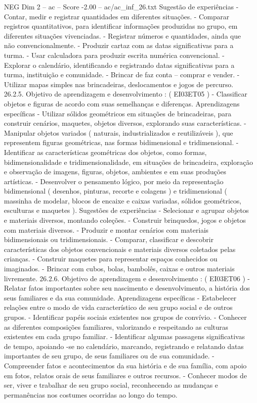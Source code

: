 \begin{textsample}{NEG Dim 2 – ac – Score -2.00 – ac/ac\_inf\_26.txt}
Sugestão de experiências - Contar, medir e registrar quantidades em diferentes situações. - Comparar registros quantitativos, para identificar informações produzidas no grupo, em diferentes situações vivenciadas. - Registrar números e quantidades, ainda que não convencionalmente. - Produzir cartaz com as datas significativas para a turma. - Usar calculadora para produzir escrita numérica convencional. - Explorar o calendário, identificando e registrando datas significativas para a turma, instituição e comunidade. - Brincar de faz conta – comprar e vender. - Utilizar mapas simples nas brincadeiras, deslocamentos e jogos de percurso. 26.2.5.
Objetivo de aprendizagem e desenvolvimento : ( EI03ET05 ) - Classificar objetos e figuras de acordo com suas semelhanças e diferenças.
Aprendizagens específicas - Utilizar sólidos geométricos em situações de brincadeiras, para construir cenários, maquetes, objetos diversos, explorando suas características. - Manipular objetos variados ( naturais, industrializados e reutilizáveis ), que representem figuras geométricas, nas formas bidimensional e tridimensional. - Identificar as características geométricas dos objetos, como formas, bidimensionalidade e tridimensionalidade, em situações de brincadeira, exploração e observação de imagens, figuras, objetos, ambientes e em suas produções artísticas. - Desenvolver o pensamento lógico, por meio da representação bidimensional ( desenhos, pinturas, recorte e colagens ) e tridimensional ( massinha de modelar, blocos de encaixe e caixas variadas, sólidos geométricos, esculturas e maquetes ).
Sugestões de experiências - Selecionar e agrupar objetos e materiais diversos, montando coleções. - Construir brinquedos, jogos e objetos com materiais diversos. - Produzir e montar cenários com materiais bidimensionais ou tridimensionais. - Comparar, classificar e descobrir características dos objetos convencionais e materiais diversos coletados pelas crianças. - Construir maquetes para representar espaços conhecidos ou imaginados. - Brincar com cubos, bolas, bambolês, caixas e outros materiais livremente. 26.2.6.
Objetivo de aprendizagem e desenvolvimento : ( EI03ET06 ) - Relatar fatos importantes sobre seu nascimento e desenvolvimento, a história dos seus familiares e da sua comunidade.
Aprendizagens específicas - Estabelecer relações entre o modo de vida característico de seu grupo social e de outros grupos. - Identificar papéis sociais existentes nos grupos de convívio. - Conhecer as diferentes composições familiares, valorizando e respeitando as culturas existentes em cada grupo familiar. - Identificar algumas passagens significativas de tempo, apoiando -se no calendário, marcando, registrando e relatando datas importantes de seu grupo, de seus familiares ou de sua comunidade. - Compreender fatos e acontecimentos da sua história e de sua família, com apoio em fotos, relatos orais de seus familiares e outros recursos. - Conhecer modos de ser, viver e trabalhar de seu grupo social, reconhecendo as mudanças e permanências nos costumes ocorridas ao longo do tempo.

\end{textsample}

